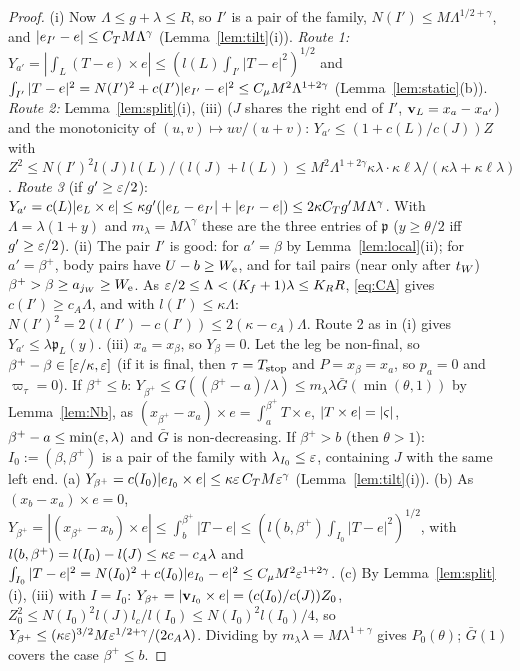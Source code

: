 \begin{proof}
(i) Now $\Lambda\le g+\lambda\le R$, so $I'$ is a pair of the family, $N(I')\le M\Lambda^{1/2+\gamma}$, and $|e_{I'}-e|\le C_T M\Lambda^\gamma$
(Lemma~\ref{lem:tilt}(i)). \emph{Route 1:} $Y_{a'}=|\int_L(T-e)\times e|\le(l(L)\int_{I'}|T-e|^2)^{1/2}$ and
$\int_{I'}|T-e|^2=N(I')^2+c(I')|e_{I'}-e|^2\le C_\mu M^2\Lambda^{1+2\gamma}$ (Lemma~\ref{lem:static}(b)). \emph{Route 2:}
Lemma~\ref{lem:split}(i), (iii) ($J$ shares the right end of $I'$, $\mathbf v_L=x_a-x_{a'}$) and the monotonicity of $(u,v)\mapsto uv/(u+v)$:
$Y_{a'}\le(1+c(L)/c(J))Z$ with $Z^2\le N(I')^2l(J)l(L)/(l(J)+l(L))\le M^2\Lambda^{1+2\gamma}\kappa\lambda\cdot\kappa\ell\lambda/(\kappa\lambda+\kappa\ell\lambda)$.
\emph{Route 3} (if $g'\ge\varepsilon/2$): $Y_{a'}=c(L)|e_L\times e|\le\kappa g'(|e_L-e_{I'}|+|e_{I'}-e|)\le2\kappa C_T g'M\Lambda^\gamma$. With
$\Lambda=\lambda(1+y)$ and $m_\lambda=M\lambda^\gamma$ these are the three entries of $\mathfrak p$ ($y\ge\theta/2$ iff $g'\ge\varepsilon/2$).
(ii) The pair $I'$ is good: for $a'=\beta$ by Lemma~\ref{lem:local}(ii); for $a'=\beta^+$, body pairs have $U-b\ge W_{\mathrm e}$, and for tail
pairs (near only after $t_W$) $\beta^+>\beta\ge a_{j_W}\ge W_{\mathrm e}$. As $\varepsilon/2\le\Lambda<(K_f+1)\lambda\le K_RR$, \eqref{eq:CA} gives
$c(I')\ge c_A\Lambda$, and with $l(I')\le\kappa\Lambda$: $N(I')^2=2(l(I')-c(I'))\le2(\kappa-c_A)\Lambda$. Route 2 as in (i) gives
$Y_{a'}\le\lambda\mathfrak p_L(y)$.
(iii) $x_a=x_\beta$, so $Y_\beta=0$. Let the leg be non-final, so $\beta^+-\beta\in[\varepsilon/\kappa,\varepsilon]$ (if it is final, then $\tau=T_{\mathrm{stop}}$
and $P=x_\beta=x_a$, so $p_a=0$ and $\varpi_\tau=0$). If $\beta^+\le b$: $Y_{\beta^+}\le G((\beta^+-a)/\lambda)\le m_\lambda\lambda\bar G(\min(\theta,1))$
by Lemma~\ref{lem:Nb}, as $(x_{\beta^+}-x_a)\times e=\int_a^{\beta^+}T\times e$, $|T\times e|=|\varsigma|$, $\beta^+-a\le\min(\varepsilon,\lambda)$ and $\bar G$
is non-decreasing. If $\beta^+>b$ (then $\theta>1$): $I_0:=(\beta,\beta^+)$ is a pair of the family with $\lambda_{I_0}\le\varepsilon$, containing $J$
with the same left end. (a) $Y_{\beta^+}=c(I_0)|e_{I_0}\times e|\le\kappa\varepsilon\,C_T M\varepsilon^\gamma$ (Lemma~\ref{lem:tilt}(i)).
(b) As $(x_b-x_a)\times e=0$, $Y_{\beta^+}=|(x_{\beta^+}-x_b)\times e|\le\int_b^{\beta^+}|T-e|\le(l(b,\beta^+)\int_{I_0}|T-e|^2)^{1/2}$, with
$l(b,\beta^+)=l(I_0)-l(J)\le\kappa\varepsilon-c_A\lambda$ and $\int_{I_0}|T-e|^2=N(I_0)^2+c(I_0)|e_{I_0}-e|^2\le C_\mu M^2\varepsilon^{1+2\gamma}$.
(c) By Lemma~\ref{lem:split}(i), (iii) with $I=I_0$: $Y_{\beta^+}=|\mathbf v_{I_0}\times e|=(c(I_0)/c(J))Z_0$, $Z_0^2\le N(I_0)^2l(J)l_c/l(I_0)\le N(I_0)^2l(I_0)/4$,
so $Y_{\beta^+}\le(\kappa\varepsilon)^{3/2}M\varepsilon^{1/2+\gamma}/(2c_A\lambda)$. Dividing by $m_\lambda\lambda=M\lambda^{1+\gamma}$ gives $P_0(\theta)$; $\bar G(1)$
covers the case $\beta^+\le b$.
\end{proof}

